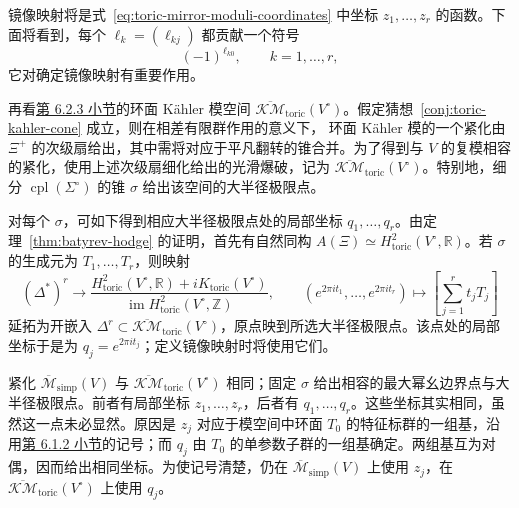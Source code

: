 镜像映射将是式~\eqref{eq:toric-mirror-moduli-coordinates} 中坐标 $z_1,\ldots,z_r$ 的函数。下面将看到，每个 $\ell_k=(\ell_{kj})$ 都贡献一个符号
\begin{equation}\label{eq:toric-mirror-sign}
(-1)^{\ell_{k0}},\qquad k=1,\ldots,r,
\end{equation}
它对确定镜像映射有重要作用。

再看\hyperref[subsec:enlarged-kahler-moduli]{第 6.2.3 小节}的环面 Kähler 模空间 $\overline{\mathcal{KM}}_{\mathrm{toric}}(V^\circ)$。假定猜想~\ref{conj:toric-kahler-cone} 成立，则在相差有限群作用的意义下，
环面 Kähler 模的一个紧化由 $\Xi^+$ 的次级扇给出，其中需将对应于平凡翻转的锥合并。为了得到与 $V$ 的复模相容的紧化，使用上述次级扇细化给出的光滑爆破，记为 $\overline{\mathcal{KM}}_{\mathrm{toric}}(V^\circ)$。特别地，细分 $\operatorname{cpl}(\Sigma^\circ)$ 的锥 $\sigma$ 给出该空间的大半径极限点。

对每个 $\sigma$，可如下得到相应大半径极限点处的局部坐标 $q_1,\ldots,q_r$。由定理~\ref{thm:batyrev-hodge} 的证明，首先有自然同构
$A(\Xi)\simeq H^2_{\mathrm{toric}}(V^\circ,\mathbb R)$。若 $\sigma$ 的生成元为 $T_1,\ldots,T_r$，则映射
\[
(\Delta^*)^r\longrightarrow
\frac{H^2_{\mathrm{toric}}(V^\circ,\mathbb R)+iK_{\mathrm{toric}}(V^\circ)}
{\operatorname{im}H^2_{\mathrm{toric}}(V^\circ,\mathbb Z)},
\qquad(e^{2\pi it_1},\ldots,e^{2\pi it_r})\longmapsto\left[\sum_{j=1}^rt_jT_j\right]
\]
延拓为开嵌入 $\Delta^r\subset\overline{\mathcal{KM}}_{\mathrm{toric}}(V^\circ)$，原点映到所选大半径极限点。该点处的局部坐标于是为 $q_j=e^{2\pi it_j}$；定义镜像映射时将使用它们。

紧化 $\overline{\mathcal M}_{\mathrm{simp}}(V)$ 与 $\overline{\mathcal{KM}}_{\mathrm{toric}}(V^\circ)$ 相同；固定 $\sigma$ 给出相容的最大幂幺边界点与大半径极限点。前者有局部坐标 $z_1,\ldots,z_r$，后者有 $q_1,\ldots,q_r$。这些坐标其实相同，虽然这一点未必显然。原因是 $z_j$ 对应于模空间中环面 $T_0$ 的特征标群的一组基，沿用\hyperref[subsec:toric-complex-moduli]{第 6.1.2 小节}的记号；而 $q_j$ 由 $T_0$ 的单参数子群的一组基确定。两组基互为对偶，因而给出相同坐标。为使记号清楚，仍在 $\overline{\mathcal M}_{\mathrm{simp}}(V)$ 上使用 $z_j$，在 $\overline{\mathcal{KM}}_{\mathrm{toric}}(V^\circ)$ 上使用 $q_j$。

